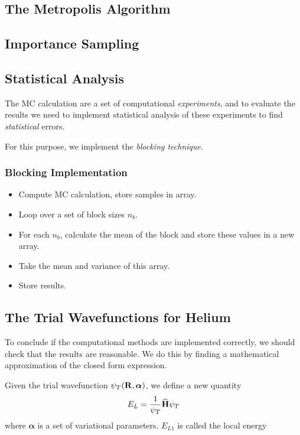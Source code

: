 \documentclass[twocolumn]{article}[12pt]
\newcommand{\eq}[1]{\begin{align*}#1\end{align*}}
\renewcommand\vec[1]{{\bf #1}}
\newcommand{\OP}[1]{{\bf\widehat{#1}}}
\begin{document}
\subsection{The Metropolis Algorithm}

\subsection{Importance Sampling}

\subsection{Statistical Analysis}
The MC calculation are a set of computational \textit{experiments}, 
and to evaluate the results 
we need to implement statistical analysis of these experiments
to find \textit{statistical} errors.

For this purpose, we implement the \textit{blocking technique}.


\subsubsection{Blocking Implementation}

\begin{itemize}
    \item Compute MC calculation, store samples in array.
    \item Loop over a set of block sizes $n_b$.
    \item For each $n_b$, calculate the mean of the block
        and store these values in a new array.
    \item Take the mean and variance of this array.
    \item Store results.
\end{itemize}

\subsection{The Trial Wavefunctions for Helium}

To conclude if the computational methods are implemented correctly,
we should check that the results are reasonable. We do this by
finding a mathematical approximation of the closed form expression.

Given the trial wavefunction $\psi_T (\vec R, \boldsymbol\alpha)$, 
we define a new quantity
{\small
\eq{
  E_L = \frac{1}{\psi_T}\OP H \psi_T
}}%
where $\boldsymbol\alpha$ is a set of variational parameters.
$E_{L1}$ is called the local energy
\end{document}
